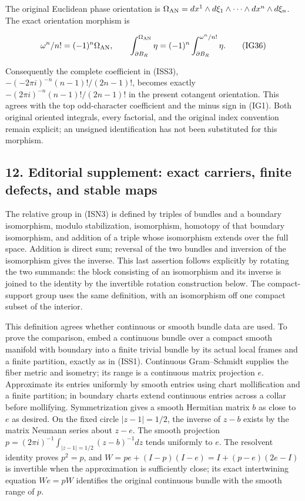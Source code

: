 \documentclass[
  11pt,
]{article}
\begin{document}
The original Euclidean phase orientation is
\(\Omega_{\rm AN}=dx^1\wedge d\xi_1\wedge\cdots\wedge dx^n\wedge d\xi_n\).
The exact orientation morphism is

\[
 \omega^n/n!=(-1)^n\Omega_{\rm AN},\qquad
 \int_{\partial B_R}^{\Omega_{\rm AN}}\eta
     =(-1)^n\int_{\partial B_R}^{\omega^n/n!}\eta.
\tag{IG36}
\]

Consequently the complete coefficient in (ISS3),
\(-(-2\pi i)^{-n}(n-1)!/(2n-1)!\), becomes exactly
\(-(2\pi i)^{-n}(n-1)!/(2n-1)!\) in the present cotangent orientation.
This agrees with the top odd-character coefficient and the minus sign in
(IG1). Both original oriented integrals, every factorial, and the
original index convention remain explicit; an unsigned identification
has not been substituted for this morphism.

\subsection{12. Editorial supplement: exact carriers, finite defects,
and stable
maps}\label{editorial-supplement-exact-carriers-finite-defects-and-stable-maps}

The relative group in (ISN3) is defined by triples of bundles and a
boundary isomorphism, modulo stabilization, isomorphism, homotopy of
that boundary isomorphism, and addition of a triple whose isomorphism
extends over the full space. Addition is direct sum; reversal of the two
bundles and inversion of the isomorphism gives the inverse. This last
assertion follows explicitly by rotating the two summands: the block
consisting of an isomorphism and its inverse is joined to the identity
by the invertible rotation construction below. The compact-support group
uses the same definition, with an isomorphism off one compact subset of
the interior.

This definition agrees whether continuous or smooth bundle data are
used. To prove the comparison, embed a continuous bundle over a compact
smooth manifold with boundary into a finite trivial bundle by its actual
local frames and a finite partition, exactly as in (ISS1). Continuous
Gram--Schmidt supplies the fiber metric and isometry; its range is a
continuous matrix projection \(e\). Approximate its entries uniformly by
smooth entries using chart mollification and a finite partition; in
boundary charts extend continuous entries across a collar before
mollifying. Symmetrization gives a smooth Hermitian matrix \(b\) as
close to \(e\) as desired. On the fixed circle \(|z-1|=1/2\), the
inverse of \(z-b\) exists by the matrix Neumann series about \(z-e\).
The smooth projection \(p=(2\pi i)^{-1}\int_{|z-1|=1/2}(z-b)^{-1}dz\)
tends uniformly to \(e\). The resolvent identity proves \(p^2=p\), and
\(W=pe+(I-p)(I-e)=I+(p-e)(2e-I)\) is invertible when the approximation
is sufficiently close; its exact intertwining equation \(We=pW\)
identifies the original continuous bundle with the smooth range of
\(p\).
\end{document}

